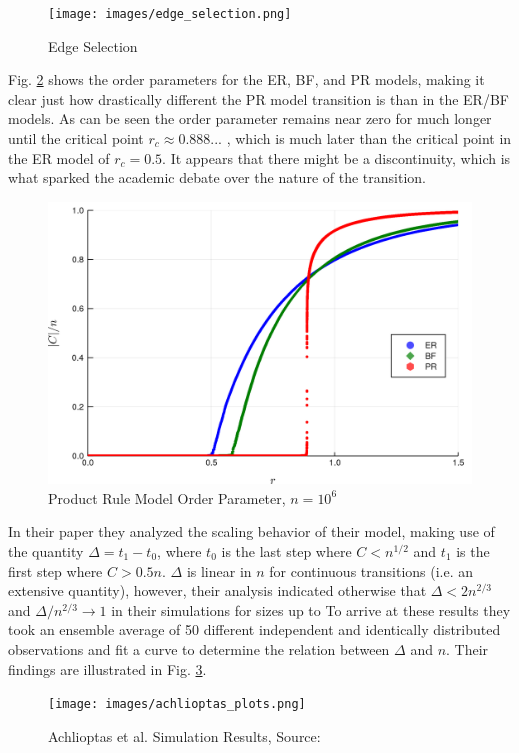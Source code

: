 \begin{figure}[H]
	\centering
	\texttt{[image: images/edge\_selection.png]}
	\caption{Edge Selection}
	\label{fig:edge_selection}
\end{figure}

Fig. \ref{fig:ER_BF_PR_transition} shows the order parameters for the ER, BF, and PR models, making it clear just how drastically different the PR model transition is than in the ER/BF models.
As can be seen the order parameter remains near zero for much longer until the critical point $r_c \approx 0.888...$ \cite{Achlioptas}, which is much later than the critical point in the ER model of $r_c = 0.5$.
It appears that there might be a discontinuity, which is what sparked the academic debate over the nature of the transition.

\begin{figure}[H]
	\centering
	\includegraphics[width=350pt]{images/ER_BF_PR_1e6_order_param.png}
	\caption{Product Rule Model Order Parameter, $n = 10^6$}
	\label{fig:ER_BF_PR_transition}
\end{figure}

In their paper they analyzed the scaling behavior of their model, making use of the quantity $\Delta = t_1 - t_0$, where $t_0$ is the last step where $C < n^{1/2}$ and $t_1$ is the first step where $C > 0.5n$.
$\Delta$ is linear in $n$ for continuous transitions (i.e. an extensive quantity), however, their analysis indicated otherwise that $\Delta < 2n^{2/3}$ and $\Delta / n^{2/3} \rightarrow 1$ in their simulations for sizes up to
To arrive at these results they took an ensemble average of 50 different independent and identically distributed observations and fit a curve to determine the relation between $\Delta$ and $n$.
Their findings are illustrated in Fig. \ref{fig:achlioptas_plots}.
\cite{Achlioptas}

\begin{figure}[H]
	\centering
	\texttt{[image: images/achlioptas\_plots.png]}
	\caption{Achlioptas et al. Simulation Results, Source: \cite{Achlioptas}}
	\label{fig:achlioptas_plots}
\end{figure}
